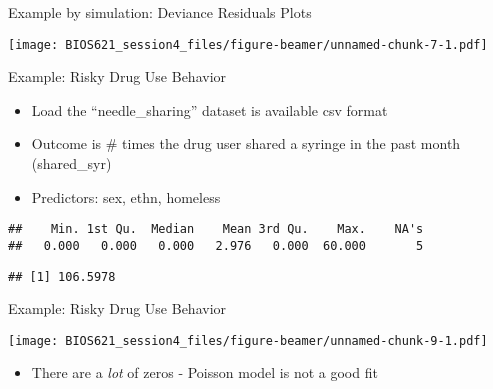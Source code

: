 \documentclass[ignorenonframetext,]{beamer}
\newenvironment{Shaded}{\begin{snugshade}}{\end{snugshade}}
\newcommand{\KeywordTok}[1]{\textcolor[rgb]{0.13,0.29,0.53}{\textbf{#1}}}
\newcommand{\DataTypeTok}[1]{\textcolor[rgb]{0.13,0.29,0.53}{#1}}
\newcommand{\StringTok}[1]{\textcolor[rgb]{0.31,0.60,0.02}{#1}}
\newcommand{\OtherTok}[1]{\textcolor[rgb]{0.56,0.35,0.01}{#1}}
\newcommand{\OperatorTok}[1]{\textcolor[rgb]{0.81,0.36,0.00}{\textbf{#1}}}
\newcommand{\NormalTok}[1]{#1}
\providecommand{\tightlist}{%
  \setlength{\itemsep}{0pt}\setlength{\parskip}{0pt}}
\begin{document}
\begin{frame}{Example by simulation: Deviance Residuals Plots}

\texttt{[image: BIOS621\_session4\_files/figure-beamer/unnamed-chunk-7-1.pdf]}

\end{frame}

\begin{frame}[fragile]{Example: Risky Drug Use Behavior}

\begin{itemize}
\tightlist
\item
  Load the ``needle\_sharing'' dataset is available csv format
\item
  Outcome is \# times the drug user shared a syringe in the past month
  (shared\_syr)
\item
  Predictors: sex, ethn, homeless
\end{itemize}

\small

\begin{Shaded}
\end{Shaded}

\begin{verbatim}
##    Min. 1st Qu.  Median    Mean 3rd Qu.    Max.    NA's 
##   0.000   0.000   0.000   2.976   0.000  60.000       5
\end{verbatim}

\begin{Shaded}
\end{Shaded}

\begin{verbatim}
## [1] 106.5978
\end{verbatim}

\end{frame}

\begin{frame}{Example: Risky Drug Use Behavior}

\texttt{[image: BIOS621\_session4\_files/figure-beamer/unnamed-chunk-9-1.pdf]}

\begin{itemize}
\tightlist
\item
  There are a \emph{lot} of zeros - Poisson model is not a good fit
\end{itemize}

\end{frame}
\end{document}
